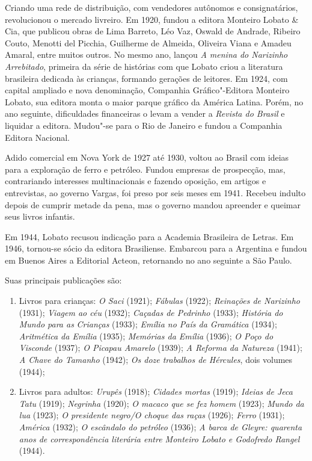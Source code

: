 \documentclass[11pt]{extarticle}
\begin{document}
Criando uma rede de distribuição, com vendedores autônomos e
consignatários, revolucionou o mercado livreiro. Em 1920, fundou a
editora Monteiro Lobato \& Cia, que publicou obras de Lima Barreto, Léo
Vaz, Oswald de Andrade, Ribeiro Couto, Menotti del Picchia, Guilherme de
Almeida, Oliveira Viana e Amadeu Amaral, entre muitos outros. No mesmo
ano, lançou \emph{A menina do Narizinho Arrebitado}, primeira da série
de histórias com que Lobato criou a literatura brasileira dedicada às
crianças, formando gerações de leitores. Em 1924, com capital ampliado e
nova denominação, Companhia Gráfico"-Editora Monteiro Lobato, sua editora
monta o maior parque gráfico da América Latina. Porém, no ano seguinte,
dificuldades financeiras o levam a vender a \emph{Revista do Brasil} e
liquidar a editora. Mudou"-se para o Rio de Janeiro e fundou a Companhia
Editora Nacional.

Adido comercial em Nova York de 1927 até 1930, voltou ao Brasil com
ideias para a exploração de ferro e petróleo. Fundou empresas de
prospecção, mas, contrariando interesses multinacionais e fazendo
oposição, em artigos e entrevistas, ao governo Vargas, foi preso por
seis meses em 1941. Recebeu indulto depois de cumprir metade da pena,
mas o governo mandou apreender e queimar seus livros infantis.

Em 1944, Lobato recusou indicação para a Academia Brasileira de Letras.
Em 1946, tornou-se sócio da editora Brasiliense. Embarcou para a
Argentina e fundou em Buenos Aires a Editorial Acteon, retornando no ano
seguinte a São Paulo.

Suas principais publicações são:

\begin{enumerate}
\item Livros para crianças: \emph{O Saci} (1921); \emph{Fábulas} (1922);
\emph{Reinações de Narizinho} (1931); \emph{Viagem ao céu} (1932);
\emph{Caçadas de Pedrinho} (1933); \emph{História do Mundo para as}
\emph{Crianças} (1933); \emph{Emília no País da Gramática} (1934);
\emph{Aritmética da Emília} (1935); \emph{Memórias da Emília} (1936);
\emph{O Poço do Visconde} (1937); \emph{O Picapau Amarelo} (1939);
\emph{A Reforma da Natureza} (1941); \emph{A Chave do Tamanho} (1942);
\emph{Os doze trabalhos de Hércules}, dois volumes (1944);

\item Livros para adultos: \emph{Urupês} (1918); \emph{Cidades
mortas} (1919); \emph{Ideias de Jeca Tatu} (1919); \emph{Negrinha}
(1920); \emph{O macaco que se fez homem} (1923); \emph{Mundo da lua}
(1923); \emph{O presidente negro/O choque das raças} (1926);
\emph{Ferro} (1931); \emph{América} (1932); \emph{O escândalo do
petróleo} (1936); \emph{A barca de Gleyre: quarenta anos de
correspondência literária entre Monteiro Lobato e Godofredo Rangel}
(1944).
\end{enumerate}
\end{document}
